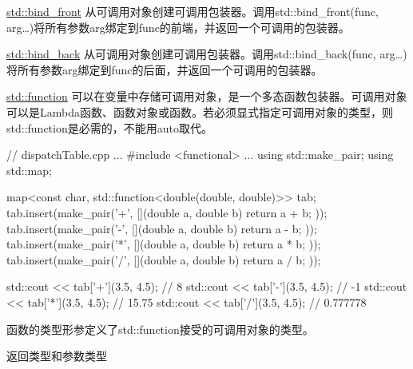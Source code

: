 
\href{https://en.cppreference.com/w/cpp/utility/functional/bind_front}{std::bind\_front} 从可调用对象创建可调用包装器。调用std::bind\_front(func, arg…)将所有参数arg绑定到func的前端，并返回一个可调用的包装器。



\href{https://en.cppreference.com/w/cpp/utility/functional/bind_front}{std::bind\_back} 从可调用对象创建可调用包装器。调用std::bind\_back(func, arg…)将所有参数arg绑定到func的后面，并返回一个可调用的包装器。


\href{http://en.cppreference.com/w/cpp/utility/functional/function}{std::function} 可以在变量中存储可调用对象，是一个多态函数包装器。可调用对象可以是Lambda函数、函数对象或函数。若必须显式指定可调用对象的类型，则std::function是必需的，不能用auto取代。


\begin{cpp}
// dispatchTable.cpp
...
#include <functional>
...
using std::make_pair;
using std::map;

map<const char, std::function<double(double, double)>> tab;
tab.insert(make_pair('+', [](double a, double b){ return a + b; }));
tab.insert(make_pair('-', [](double a, double b){ return a - b; }));
tab.insert(make_pair('*', [](double a, double b){ return a * b; }));
tab.insert(make_pair('/', [](double a, double b){ return a / b; }));

std::cout << tab['+'](3.5, 4.5); // 8
std::cout << tab['-'](3.5, 4.5); // -1
std::cout << tab['*'](3.5, 4.5); // 15.75
std::cout << tab['/'](3.5, 4.5); // 0.777778
\end{cpp}

函数的类型形参定义了std::function接受的可调用对象的类型。

\begin{center}
返回类型和参数类型
\end{center}

